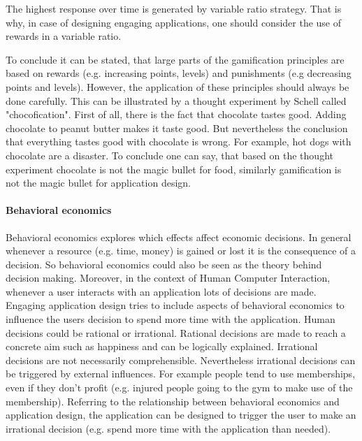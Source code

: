 The highest response over time is generated by variable ratio strategy. That is why, in case of designing engaging applications, one should consider the use of rewards in a variable ratio. \cite[p. 11]{lewisIrresistibleAppsMotivational2014}

To conclude it can be stated, that large parts of the gamification principles are based on rewards (e.g. increasing points, levels) and punishments (e.g decreasing points and levels). However, the application of these principles should always be done carefully. This can be illustrated by a thought experiment by Schell called "chocofication". First of all, there is the fact that chocolate tastes good. Adding chocolate to peanut butter makes it taste good. But nevertheless the conclusion that everything tastes good with chocolate is wrong. For example, hot dogs with chocolate are a disaster. 
To conclude one can say, that based on the thought experiment chocolate is not the magic bullet for food, similarly gamification is not the magic bullet for application design. \cite[p. 12]{lewisIrresistibleAppsMotivational2014}


\paragraph*{Behavioral economics}

Behavioral economics explores which effects affect economic decisions. In general whenever a resource (e.g. time, money) is gained or lost it is the consequence of a decision. So behavioral economics could also be seen as the theory behind decision making. Moreover, in the context of Human Computer Interaction, whenever a user interacts with an application lots of decisions are made. Engaging application design tries to include aspects of behavioral economics to influence the users decision to spend more time with the application. 
Human decisions could be rational or irrational. Rational decisions are made to reach a concrete aim such as happiness and can be logically explained. Irrational decisions are not necessarily comprehensible. Nevertheless irrational decisions can be triggered by external influences. For example people tend to use memberships, even if they don't profit (e.g. injured people going to the gym to make use of the membership).
Referring to the relationship between behavioral economics and application design, the application can be designed to trigger the user to make an irrational decision (e.g. spend more time with the application than needed). \cite[p. 19]{lewisIrresistibleAppsMotivational2014}



